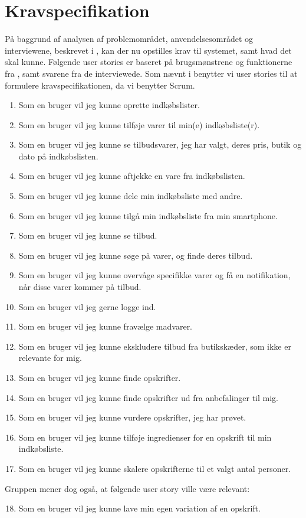 \section{Kravspecifikation}\label{sec:krav}

På baggrund af analysen af problemområdet, anvendelsesområdet og interviewene, beskrevet i , kan der nu opstilles krav til systemet, samt hvad det skal kunne.
Følgende user stories er baseret på brugsmønstrene og funktionerne fra , samt svarene fra de interviewede.
Som nævnt i  benytter vi user stories til at formulere kravspecifikationen, da vi benytter Scrum.

\begin{enumerate}
	\item Som en bruger vil jeg kunne oprette indkøbslister.
	\item Som en bruger vil jeg kunne tilføje varer til min(e) indkøbsliste(r).
	\item Som en bruger vil jeg kunne se tilbudsvarer, jeg har valgt, deres pris, butik og dato på indkøbslisten.
	\item Som en bruger vil jeg kunne aftjekke en vare fra indkøbslisten.
	\item Som en bruger vil jeg kunne dele min indkøbsliste med andre.
	\item Som en bruger vil jeg kunne tilgå min indkøbsliste fra min smartphone.
			
	\item Som en bruger vil jeg kunne se tilbud.
	\item Som en bruger vil jeg kunne søge på varer, og finde deres tilbud. 
	
	\item Som en bruger vil jeg kunne overvåge specifikke varer og få en notifikation, når disse varer kommer på tilbud.
	
	\item Som en bruger vil jeg gerne logge ind.
	\item Som en bruger vil jeg kunne fravælge madvarer.
	\item Som en bruger vil jeg kunne ekskludere tilbud fra butikskæder, som ikke er relevante for mig.
	
	\item Som en bruger vil jeg kunne finde opskrifter.
	\item Som en bruger vil jeg kunne finde opskrifter ud fra anbefalinger til mig.
	\item Som en bruger vil jeg kunne vurdere opskrifter, jeg har prøvet.
	\item Som en bruger vil jeg kunne tilføje ingredienser for en opskrift til min indkøbsliste.
	\item Som en bruger vil jeg kunne skalere opskrifterne til et valgt antal personer.
\end{enumerate}
Gruppen mener dog også, at følgende user story ville være relevant: 
\begin{enumerate}
\setcounter{enumi}{17}
	\item Som en bruger vil jeg kunne lave min egen variation af en opskrift.
\end{enumerate}

